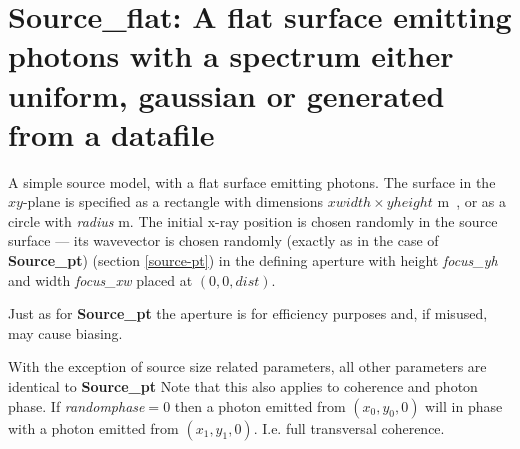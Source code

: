 \section{Source\_flat: A flat surface emitting photons with a spectrum either uniform, gaussian or generated from a datafile}
\label{source-flat}

A simple source model, with a flat surface emitting photons. The surface in the
$xy$-plane is specified as a rectangle with dimensions
$\mathit{xwidth}\times \mathit{yheight}$ \si{m \squared}, or as a circle with \textit{radius} \si{m}. 
The initial x-ray position is chosen randomly in the source surface --- its
wavevector is chosen randomly (exactly as in the case of \textbf{Source\_pt})
(section \ref{source-pt}) in the defining aperture with height \textit{focus\_yh} and
width \textit{focus\_xw} placed at $(0,0,\mathit{dist})$. 

Just as for \textbf{Source\_pt} the aperture is for efficiency purposes and, if misused, may cause biasing.

With the exception of source size related parameters, all other parameters are
identical to \textbf{Source\_pt} Note that this also applies to coherence and
photon phase. If \textit{randomphase}$=0$ then a photon emitted from
$(x_0,y_0,0)$ will in phase with a photon emitted from $(x_1,y_1,0)$. I.e. full
transversal coherence.
